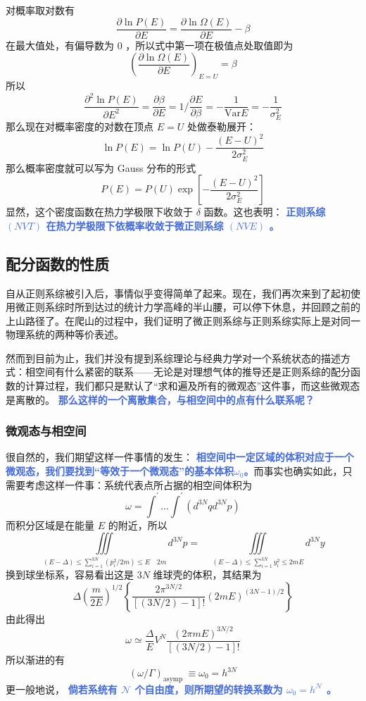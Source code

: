 \documentclass[hyperref,UTF-8]{ctexart}
\newcommand{\0}{\boldsymbol{0}}
\begin{document}
对概率取对数有
\[
    \frac{\partial \ln P(E)}{\partial E} = \frac{\partial \ln \Omega (E)}{\partial E} - \beta
\]
在最大值处，有偏导数为 $0$ ，所以式中第一项在极值点处取值即为
\[
    \left(\frac{\partial \ln \Omega (E)}{\partial E}\right)_{E = U} = \beta
\]
所以
\[
    \frac{\partial^2 \ln P(E)}{\partial E^2} = \frac{\partial \beta}{\partial E} = 1\bigg/\frac{\partial E}{\partial \beta} = -\frac{1}{\text{Var}E}  = -\frac{1}{\sigma^2_E}
\]
那么现在对概率密度的对数在顶点 $E = U$ 处做泰勒展开：
\[
    \ln P(E) = \ln P(U) -\frac{(E - U)^2}{2\sigma^2_E}
\]
那么概率密度就可以写为 Gauss 分布的形式
\begin{equation}
    P(E) = P(U)\exp\left[-\frac{(E - U)^2}{2\sigma^2_E}\right]
\end{equation}
显然，这个密度函数在热力学极限下收敛于 $\delta$ 函数。这也表明： \textcolor{RoyalBlue}{\textbf{\kaishu 正则系综 $(NVT)$ 在热力学极限下依概率收敛于微正则系综 $(NVE)$ 。}}

\subsection{配分函数的性质}

自从正则系综被引入后，事情似乎变得简单了起来。现在，我们再次来到了起初使用微正则系综时所到达过的统计力学高峰的半山腰，可以停下休息，并回顾之前的上山路径了。在爬山的过程中，我们证明了微正则系综与正则系综实际上是对同一物理系统的两种等价表述。

然而到目前为止，我们并没有提到系综理论与经典力学对一个系统状态的描述方式：相空间有什么紧密的联系——无论是对理想气体的推导还是正则系综的配分函数的计算过程，我们都只是默认了“求和遍及所有的微观态”这件事，而这些微观态是离散的。 \textcolor{RoyalBlue}{\textbf{\kaishu 那么这样的一个离散集合，与相空间中的点有什么联系呢？}}

\subsubsection{微观态与相空间}

很自然的，我们期望这样一件事情的发生： \textcolor{RoyalBlue}{\textbf{\kaishu 相空间中一定区域的体积对应于一个微观态，我们要找到“等效于一个微观态”的基本体积$\omega_0$。}}而事实也确实如此，只需要考虑这样一件事：系统代表点所占据的相空间体积为
\begin{equation}
    \omega=\int^{\prime} \ldots \int^{\prime}\left(d^{3 N} q d^{3 N} p\right)
\end{equation}
而积分区域是在能量 $E$ 的附近，所以
\[
    \iiint\limits_{(E-\Delta) \leq \sum_{i=1}^{3 N}\left(p_i^2 / 2 m\right) \leq E \quad 2 m} d^{3 N} p=\quad \iiint\limits_{(E-\Delta) \leq \sum_{i=1}^{3 N} y_i^2 \leq 2 m E
    } d^{3 N} y
\]
换到球坐标系，容易看出这是 $3N$ 维球壳的体积，其结果为
\[
    \Delta\left(\frac{m}{2 E}\right)^{1 / 2}\left\{\frac{2 \pi^{3 N / 2}}{[(3 N / 2)-1] !}(2 m E)^{(3 N-1) / 2}\right\}
\]
由此得出
\[
    \omega \simeq \frac{\Delta}{E} V^N \frac{(2 \pi m E)^{3 N / 2}}{[(3 N / 2)-1] !}
\]
所以渐进的有
\begin{equation}
    (\omega / \Gamma)_{\text {asymp }} \equiv \omega_0=h^{3 N}
\end{equation}
更一般地说， \textcolor{RoyalBlue}{\textbf{\kaishu 倘若系统有 $\mathcal{N}$ 个自由度，则所期望的转换系数为 $\omega_0 = h^{\mathcal{N}}$ 。}}
\end{document}
